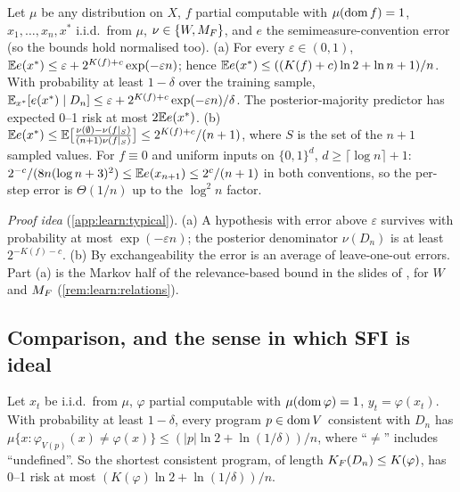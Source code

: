\begin{corollary}\label{cor:learn:perstep}
Let $\mu$ be any distribution on $X$, $f$ partial computable with $\mu(\operatorname{dom} f)=1$, $x_1,\dots,x_n,x^*$ i.i.d.\ from $\mu$, $\nu\in\{W,M_{F}\}$, and $e$ the semimeasure-convention error (so the bounds hold normalised too).
(a) For every $\varepsilon\in(0,1)$, $\mathbb{E} e(x^*)\le\varepsilon+2^{K(f)+c}\exp(-\varepsilon n)$; hence $\mathbb{E} e(x^*)\le((K(f)+c)\ln2+\ln n+1)/n$. With probability at least $1-\delta$ over the training sample, $\mathbb{E}_{x^*}[e(x^*)\mid D_n]\le\varepsilon+2^{K(f)+c}\exp(-\varepsilon n)/\delta$. The posterior-majority predictor has expected 0--1 risk at most $2\mathbb{E} e(x^*)$.
(b) $\mathbb{E} e(x^*)\le\mathbb{E}\big[\frac{\nu(\emptyset)-\nu(f|_S)}{(n+1)\nu(f|_S)}\big]\le2^{K(f)+c}/(n+1)$, where $S$ is the set of the $n+1$ sampled values.
For $f\equiv0$ and uniform inputs on $\{0,1\}^d$, $d\ge\lceil\log n\rceil+1$: $2^{-c}/(8n(\log n+3)^2)\le\mathbb{E} e(x_{n+1})\le2^{c}/(n+1)$ in both conventions, so the per-step error is $\Theta(1/n)$ up to the $\log^2n$ factor.
\end{corollary}

\emph{Proof idea} (\cref{app:learn:typical}). (a) A hypothesis with error above $\varepsilon$ survives with probability at most $\exp(-\varepsilon n)$; the posterior denominator $\nu(D_n)$ is at least $2^{-K(f)-c}$. (b) By exchangeability the error is an average of leave-one-out errors. Part (a) is the Markov half of the relevance-based bound in the slides of \citet{vaintrobhanni2026nnbayes}, for $W$ and $M_{F}$ (\cref{rem:learn:relations}).

\subsection{Comparison, and the sense in which SFI is ideal}\label{sec:learn:ideal}

\begin{proposition}\label{prop:learn:occam}
Let $x_t$ be i.i.d.\ from $\mu$, $\varphi$ partial computable with $\mu(\operatorname{dom}\varphi)=1$, $y_t=\varphi(x_t)$. With probability at least $1-\delta$, every program $p\in\operatorname{dom} V$ consistent with $D_n$ has $\mu\{x:\varphi_{V(p)}(x)\ne\varphi(x)\}\le(|p|\ln2+\ln(1/\delta))/n$, where ``$\ne$'' includes ``undefined''. So the shortest consistent program, of length $K_{F}(D_n)\le K(\varphi)$, has 0--1 risk at most $(K(\varphi)\ln2+\ln(1/\delta))/n$.
\end{proposition}

